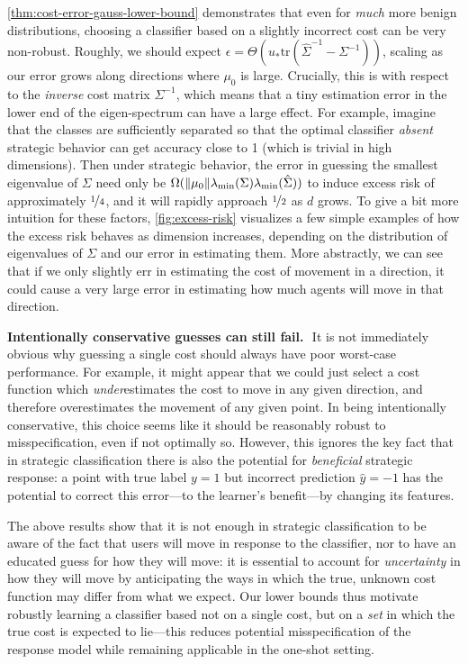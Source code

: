 \documentclass{article}
\newcommand{\costmatrix}{\Sigma}
\newcommand{\uinv}{\ensuremath{u_{*}}}
\newcommand{\gYhat}{{\hat{y}}}
\theoremstyle{definition}
\renewcommand{\paragraph}[1]{{\textbf{#1}\,\,}}
\begin{document}
\cref{thm:cost-error-gauss-lower-bound} demonstrates that even for \emph{much} more benign distributions, choosing a classifier based on a slightly incorrect cost can be very non-robust. Roughly, we should expect $\epsilon = \Theta(\uinv \textrm{tr}(\hat\costmatrix^{-1} - \costmatrix^{-1}))$, scaling as our error grows along directions where $\mu_0$ is large. Crucially, this is with respect to the \emph{inverse} cost matrix $\costmatrix^{-1}$, which means that a tiny estimation error in the lower end of the eigen-spectrum can have a large effect. For example, imagine that the classes are sufficiently separated so that the optimal classifier \emph{absent} strategic behavior can get accuracy close to 1 (which is trivial in high dimensions). Then under strategic behavior, the error in guessing the smallest eigenvalue of $\costmatrix$ need only be $\Omega(\norm{\mu_0} \lambda_{\min}(\costmatrix) \lambda_{\min}(\hat\costmatrix))$ to induce excess risk of approximately $\nicefrac{1}{4}$, and it will rapidly approach $\nicefrac{1}{2}$ as $d$ grows. To give a bit more intuition for these factors, \cref{fig:excess-risk} visualizes a few simple examples of how the excess risk behaves as dimension increases, depending on the distribution of eigenvalues of $\costmatrix$ and our error in estimating them. More abstractly, we can see that if we only slightly err in estimating the cost of movement in a direction, it could cause a very large error in estimating how much agents will move in that direction.

\paragraph{Intentionally conservative guesses can still fail.} It is not immediately obvious why guessing a single cost should always have poor worst-case performance. For example, it might appear that we could just select a cost function which \emph{under}estimates the cost to move in any given direction, and therefore overestimates the movement of any given point. In being intentionally conservative, this choice seems like it should be reasonably robust to misspecification, even if not optimally so. However, this ignores the key fact that in strategic classification there is also the potential for \emph{beneficial} strategic response: a point with true label $y=1$ but incorrect prediction $\gYhat=-1$ has the potential to correct this error---to the learner's benefit---by changing its features.


The above results show that it is not enough in strategic classification to be aware of the fact that users will move in response to the classifier, nor to have an educated guess for how they will move: it is essential to account for \emph{uncertainty} in how they will move by anticipating the ways in which the true, unknown cost function may differ from what we expect. Our lower bounds thus motivate robustly learning a classifier based not on a single cost, but on a \emph{set} in which the true cost is expected to lie---this reduces potential misspecification of the response model \citep{lin2023plug} while remaining applicable in the one-shot setting.
\end{document}

